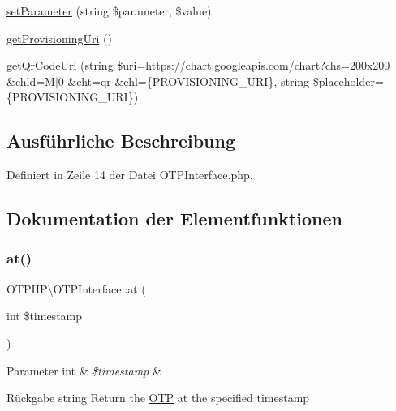 \begin{DoxyCompactItemize}
\item 
\mbox{\hyperlink{interface_o_t_p_h_p_1_1_o_t_p_interface_a7b2673de7bc53ea83beb65a1ad53a53c}{set\+Parameter}} (string \$parameter, \$value)
\item 
\mbox{\hyperlink{interface_o_t_p_h_p_1_1_o_t_p_interface_a6e8f0a0c2f1c3ec16426a80fc9610089}{get\+Provisioning\+Uri}} ()
\item 
\mbox{\hyperlink{interface_o_t_p_h_p_1_1_o_t_p_interface_a7ada4a07d246ce1582aa563955c9d671}{get\+Qr\+Code\+Uri}} (string \$uri=\textquotesingle{}https\+://chart.\+googleapis.\+com/chart?chs=200x200 \&chld=\+M$\vert$0 \&cht=qr \&chl=\{\+P\+R\+O\+V\+I\+S\+I\+O\+N\+I\+N\+G\+\_\+\+U\+R\+I\}\textquotesingle{}, string \$placeholder=\textquotesingle{}\{\+P\+R\+O\+V\+I\+S\+I\+O\+N\+I\+N\+G\+\_\+\+U\+R\+I\}\textquotesingle{})
\end{DoxyCompactItemize}


\subsection{Ausführliche Beschreibung}


Definiert in Zeile 14 der Datei O\+T\+P\+Interface.\+php.



\subsection{Dokumentation der Elementfunktionen}
\mbox{\label{interface_o_t_p_h_p_1_1_o_t_p_interface_afbc45b669ea3ae41d0b252901de69d54}} 
\subsubsection{\texorpdfstring{at()}{at()}}
{\footnotesize\ttfamily O\+T\+P\+H\+P\textbackslash{}\+O\+T\+P\+Interface\+::at (\begin{DoxyParamCaption}\item[{int}]{\$timestamp }\end{DoxyParamCaption})}


\begin{DoxyParams}[1]{Parameter}
int & {\em \$timestamp} & \\
\hline
\end{DoxyParams}
\begin{DoxyReturn}{Rückgabe}
string Return the \mbox{\hyperlink{class_o_t_p_h_p_1_1_o_t_p}{O\+TP}} at the specified timestamp 
\end{DoxyReturn}


